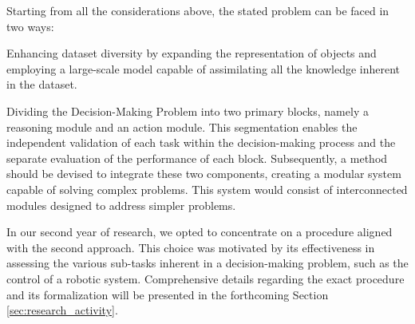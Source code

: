 Starting from all the considerations above, the stated problem can be faced in two ways:
\begin{enumerate*}[label=(\arabic*)]
    \item Enhancing dataset diversity by expanding the representation of objects and employing a large-scale model capable of assimilating all the knowledge inherent in the dataset.
    \item Dividing the Decision-Making Problem into two primary blocks, namely a reasoning module and an action module. This segmentation enables the independent validation of each task within the decision-making process and the separate evaluation of the performance of each block. Subsequently, a method should be devised to integrate these two components, creating a modular system capable of solving complex problems. This system would consist of interconnected modules designed to address simpler problems.
\end{enumerate*}
In our second year of research, we opted to concentrate on a procedure aligned with the second approach. This choice was motivated by its effectiveness in assessing the various sub-tasks inherent in a decision-making problem, such as the control of a robotic system. Comprehensive details regarding the exact procedure and its formalization will be presented in the forthcoming Section \ref{sec:research_activity}.
